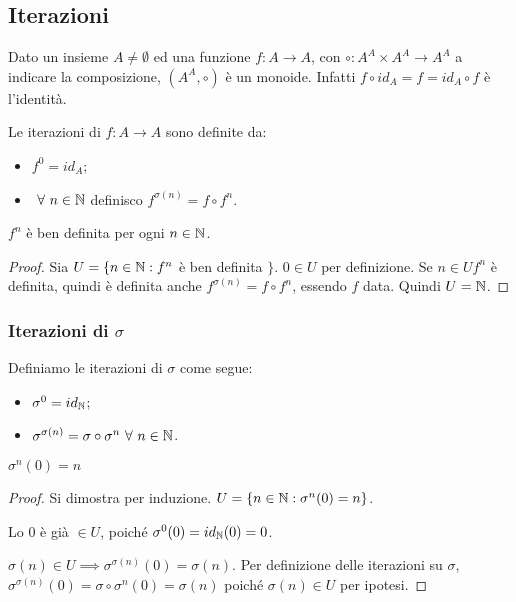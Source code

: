 \subsection{Iterazioni}

Dato un insieme $A \neq \emptyset$ ed una funzione $f : A \to A$, con $\circ : A^A \times A^A \to A^A$ a indicare la composizione, $(A^A, \circ)$ \`e un monoide. Infatti $f \circ id_A = f = id_A \circ f$ \`e l'identit\`a.

\begin{defn}[Iterazioni]
Le iterazioni di $f : A \to A$ sono definite da:
\begin{itemize}
  \item $f^0 = id_A$;
  \item $\forall n \in \naturals$ definisco $f^{\sigma(n)} = f \circ f^n$.
\end{itemize}
\end{defn}
\begin{prop}
$f^n$ \`e ben definita per ogni $n \in \mathbb{N}$.
\end{prop}
\begin{proof}
Sia $U = \{ n \in \mathbb{N} : f^n $ \`e ben definita $\}$. $0 \in U$ per definizione. Se $n \in U f^n$ \`e definita, quindi \`e definita anche $f^{\sigma(n)} = f \circ f^n$, essendo $f$ data. Quindi $U = \mathbb{N}$.
\end{proof}
\subsubsection{Iterazioni di $\sigma$}
\begin{defn}
Definiamo le iterazioni di $\sigma$ come segue:
\begin{itemize}
  \item $\sigma^0 = id_{\mathbb{N}}$;
  \item $\sigma^{\sigma(n)} = \sigma \circ \sigma^n \forall n \in \naturals$.
\end{itemize}
\end{defn}

\begin{prop}\label{iterazione_nesima}
$\sigma^n(0) = n$
\end{prop}
\begin{proof}
Si dimostra per induzione. $U = \{ n \in \mathbb{N} : \sigma^n(0) = n \}$. 

Lo 0 \`e gi\`a $\in U$, poich\'e $\sigma^0 (0) = id_{\mathbb{N}}(0) = 0$.

$\sigma(n) \in U \implies \sigma^{\sigma(n)} (0) = \sigma(n)$. Per definizione delle iterazioni su $\sigma$, $\sigma^{\sigma(n)}(0) = \sigma \circ \sigma^{n} (0) = \sigma(n)$ poich\'e $\sigma(n) \in U$ per ipotesi.
\end{proof}

